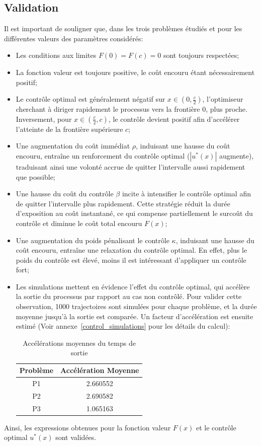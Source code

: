 \subsection{Validation}
Il est important de souligner que, dans les trois problèmes étudiés et pour les différentes valeurs des paramètres considérés:
\begin{itemize}
    \item Les conditions aux limites $F(0)=F(c)=0$ sont toujours respectées;
    \item La fonction valeur est toujours positive, le coût encouru étant nécessairement positif;
    \item Le contrôle optimal est généralement négatif sur \( x \in \left(0, \frac{c}{2}\right) \), l'optimiseur cherchant à diriger rapidement le processus vers la frontière \( 0 \), plus proche. Inversement, pour \( x \in \left(\frac{c}{2}, c\right) \), le contrôle devient positif afin d'accélérer l'atteinte de la frontière supérieure \( c \);
    \item Une augmentation du coût immédiat $\rho$, induisant une hausse du coût encouru, entraîne un renforcement du contrôle optimal ($|u^*(x)|$ augmente), traduisant ainsi une volonté accrue de quitter l'intervalle aussi rapidement que possible;
    \item Une hausse du coût du contrôle $\beta$ incite à intensifier le contrôle optimal afin de quitter l'intervalle plus rapidement. Cette stratégie réduit la durée d'exposition au coût instantané, ce qui compense partiellement le surcoût du contrôle et diminue le coût total encouru $F(x)$;
    \item Une augmentation du poids pénalisant le contrôle $\kappa$, induisant une hausse du coût encouru, entraîne une relaxation du contrôle optimal. En effet, plus le poids du contrôle est élevé, moins il est intéressant d'appliquer un contrôle fort;
    \item Les simulations mettent en évidence l'effet du contrôle optimal, qui accélère la sortie du processus par rapport au cas non contrôlé. Pour valider cette observation, 1000 trajectoires sont simulées pour chaque problème, et la durée moyenne jusqu'à la sortie est comparée. Un facteur d'accélération est ensuite estimé (Voir annexe~\ref{control_simulations} pour les détails du calcul):
    \begin{table}[htb]
        \centering
        \caption{Accélérations moyennes du temps de sortie}\label{tab:acceleration_results}
        \renewcommand{\arraystretch}{1.1}
        \begin{tabular}{||c|c||}
        \hline
        Problème & Accélération Moyenne \\\hline\hline
        P1 & 2.660552 \\
        P2 & 2.690582 \\
        P3 & 1.065163 \\\hline
        \end{tabular}
    \end{table}\FloatBarrier
\end{itemize}
Ainsi, les expressions obtenues pour la fonction valeur $F(x)$ et le contrôle optimal $u^*(x)$ sont validées.

